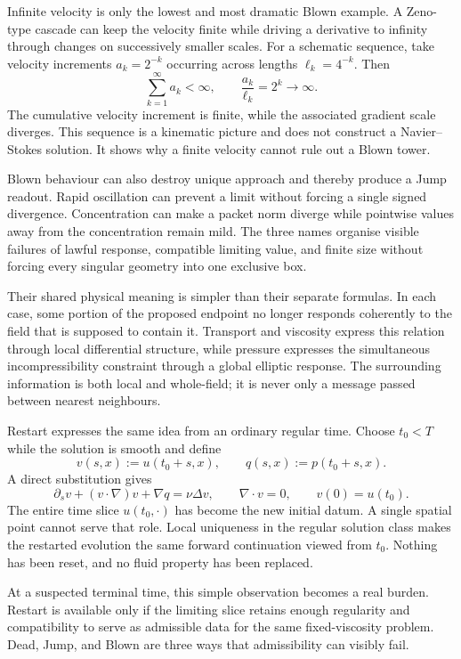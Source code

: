 Infinite velocity is only the lowest and most dramatic Blown example.
A Zeno-type cascade can keep the velocity finite while driving a derivative to infinity through changes on successively smaller scales.
For a schematic sequence, take velocity increments \(a_k=2^{-k}\) occurring across lengths \(\ell_k=4^{-k}\).
Then
\[
  \sum_{k=1}^{\infty}a_k<\infty,
  \qquad
  \frac{a_k}{\ell_k}=2^k\longrightarrow\infty.
\]
The cumulative velocity increment is finite, while the associated gradient scale diverges.
This sequence is a kinematic picture and does not construct a Navier--Stokes solution.
It shows why a finite velocity cannot rule out a Blown tower.

Blown behaviour can also destroy unique approach and thereby produce a Jump readout.
Rapid oscillation can prevent a limit without forcing a single signed divergence.
Concentration can make a packet norm diverge while pointwise values away from the concentration remain mild.
The three names organise visible failures of lawful response, compatible limiting value, and finite size without forcing every singular geometry into one exclusive box.

Their shared physical meaning is simpler than their separate formulas.
In each case, some portion of the proposed endpoint no longer responds coherently to the field that is supposed to contain it.
Transport and viscosity express this relation through local differential structure, while pressure expresses the simultaneous incompressibility constraint through a global elliptic response.
The surrounding information is both local and whole-field; it is never only a message passed between nearest neighbours.


Restart expresses the same idea from an ordinary regular time.
Choose \(t_0<T\) while the solution is smooth and define
\[
  v(s,x):=u(t_0+s,x),
  \qquad
  q(s,x):=p(t_0+s,x).
\]
A direct substitution gives
\[
  \partial_sv+(v\cdot\nabla)v+\nabla q
  =
  \nu\Delta v,
  \qquad
  \nabla\cdot v=0,
  \qquad
  v(0)=u(t_0).
\]
The entire time slice \(u(t_0,\cdot)\) has become the new initial datum.
A single spatial point cannot serve that role.
Local uniqueness in the regular solution class makes the restarted evolution the same forward continuation viewed from \(t_0\).
Nothing has been reset, and no fluid property has been replaced.

At a suspected terminal time, this simple observation becomes a real burden.
Restart is available only if the limiting slice retains enough regularity and compatibility to serve as admissible data for the same fixed-viscosity problem.
Dead, Jump, and Blown are three ways that admissibility can visibly fail.
